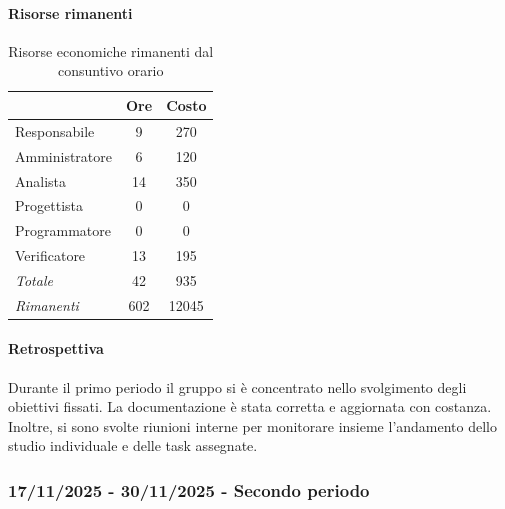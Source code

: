 \documentclass[a4paper,12pt]{article}
\begin{document}
            \paragraph{Risorse rimanenti}
                \begin{table}[H]
                \centering
                \begin{tabular}{|l|c|c|}
                \hline
                    \rowcolor{lightgray}{\textbf{Ruolo}} & {\textbf{Ore}} & {\textbf{Costo}}\\
                \hline
                    Responsabile & 9 & 270\\
                \hline
                    Amministratore & 6 & 120\\
                \hline
                    Analista & 14 & 350\\
                \hline
                    Progettista & 0 & 0\\
                \hline
                    Programmatore & 0 & 0\\
                \hline
                    Verificatore & 13 & 195\\
                \hline
                    \rowcolor{lightgray}\textit{Totale} & 42 & 935\\
                \hline
                    \rowcolor{lightgray}\textit{Rimanenti} & 602 & 12045\\
                \hline
                \end{tabular}
                \caption{Risorse economiche rimanenti dal consuntivo orario}
                \end{table}
                
            \paragraph{Retrospettiva}
            Durante il primo periodo il gruppo si è concentrato nello svolgimento degli obiettivi fissati. La documentazione è stata corretta e aggiornata con costanza. Inoltre, si sono svolte riunioni interne per monitorare insieme l'andamento dello studio individuale e delle task assegnate.

        \subsubsection{17/11/2025 - 30/11/2025 - Secondo periodo}
\end{document}
